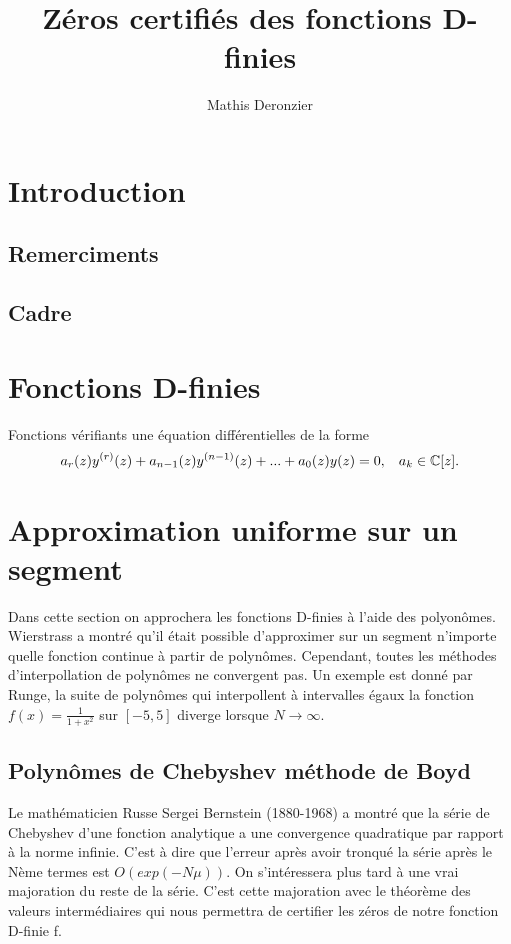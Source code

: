 \documentclass[a4paper,10.5pt]{article}
\title{Zéros certifiés des fonctions D-finies}
\author{Mathis Deronzier}
\date{}
\begin{document}
	
	\maketitle
	\renewcommand{\contentsname}{Sommaire}
	\newpage
	\tableofcontents
	\newpage
	
	\section{Introduction}
	\newtheorem{theorem}{Théorème}[section] 
	\newtheorem{proposition}{Proposition}
	\newtheorem{corollaire}{Corollaire}
	\newtheorem{definition}{Définition}
	\subsection{Remerciments}
	\subsection{Cadre}
	\section{Fonctions D-finies}
	
	Fonctions vérifiants une équation différentielles de la forme
	\[a_{r}(z)y^{(r)}(z)+a_{n-1}(z)y^{(n-1)}(z)+...+a_{0}(z)y(z)=0, \hspace{3mm} a_{k}\in \mathbb{C}[z].\] 
	
	
	
	
	
	\section{Approximation uniforme sur un segment}
	
	Dans cette section on approchera les fonctions D-finies à l'aide des polyonômes.
	Wierstrass a montré qu'il était possible d'approximer sur un segment n'importe quelle fonction continue à partir de polynômes. Cependant, toutes les méthodes d'interpollation de polynômes ne convergent pas. Un exemple est donné par Runge, la suite de polynômes qui interpollent à intervalles égaux la fonction $f(x)=\frac{1}{1+x^{2}}$ sur $[-5,5]$ diverge lorsque $N \rightarrow \infty$.
	
	\subsection{Polynômes de Chebyshev méthode de Boyd}
	
	
	Le mathématicien Russe Sergei Bernstein (1880-1968) a montré que la série de Chebyshev d'une fonction analytique a une convergence quadratique par rapport à la norme infinie. C'est à dire que l'erreur après avoir tronqué la série après le Nème termes est $O(exp(-N\mu))$. On s'intéressera plus tard à une vrai majoration du reste de la série.
	C'est cette majoration avec le théorème des valeurs intermédiaires qui nous permettra de certifier les zéros de notre fonction D-finie f.
	
\end{document}
